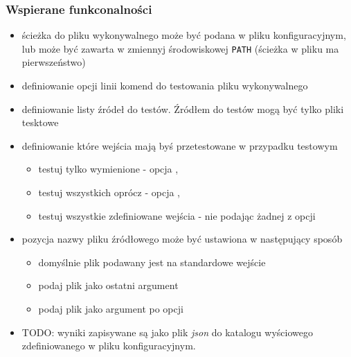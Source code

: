 \documentclass[a4paper,12pt]{article}
\begin{document}
\begin{itemize}
\subsubsection{Wspierane funkconalności}
\begin{itemize}
  \item ścieżka do pliku wykonywalnego może być podana w pliku konfiguracyjnym, lub może być zawarta w zmiennyj środowiskowej \texttt{PATH} (ścieżka w pliku ma pierwszeństwo)
  \item definiowanie opcji linii komend do testowania pliku wykonywalnego
  \item definiowanie listy źródeł do testów. Źródłem do testów mogą być tylko pliki tesktowe
  \item definiowanie które wejścia mają byś przetestowane w przypadku testowym
    \begin{itemize}
      \item testuj tylko wymienione - opcja ,
      \item testuj wszystkich oprócz - opcja ,
      \item testuj wszystkie zdefiniowane wejścia - nie podając żadnej z opcji
    \end{itemize}
  \item pozycja nazwy pliku źródłowego może być ustawiona w następujący sposób
    \begin{itemize}
      \item domyślnie plik podawany jest na standardowe wejście
      \item podaj plik jako ostatni argument 
      \item podaj plik jako argument po opcji 
    \end{itemize}
  \item TODO: wyniki zapisywane są jako plik \textit{json} do katalogu wyściowego zdefiniowanego w pliku konfiguracyjnym.
\end{itemize}


\end{itemize}
\end{document}
